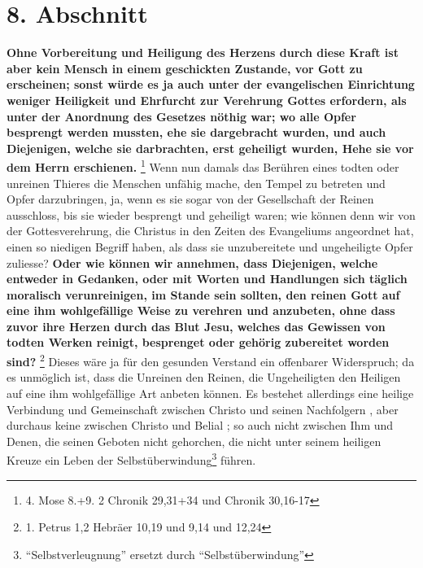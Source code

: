 \section{8. Abschnitt} \label{kap6_ab8}

\textbf{Ohne Vorbereitung und Heiligung des Herzens
durch diese Kraft ist aber kein
Mensch in einem geschickten Zustande, vor Gott zu erscheinen; sonst würde es ja
auch unter der evangelischen Einrichtung weniger Heiligkeit und Ehrfurcht zur
Verehrung Gottes erfordern, als unter der Anordnung des Gesetzes nöthig war; wo
alle Opfer besprengt werden mussten, ehe sie dargebracht wurden, und auch
Diejenigen, welche sie darbrachten, erst geheiligt wurden, Hehe sie vor dem
Herrn erschienen.}
\footnote{4. Mose 8.+9. 2 Chronik 29,31+34 und Chronik 30,16-17}
Wenn nun damals das Berühren eines todten oder unreinen Thieres die Menschen
unfähig mache, den Tempel zu betreten und Opfer darzubringen, ja, wenn es sie
sogar von der Gesellschaft der Reinen ausschloss, bis sie wieder besprengt und
geheiligt waren; wie können denn wir von der Gottesverehrung, die Christus in
den Zeiten des Evangeliums angeordnet hat, einen so niedigen Begriff haben, als
dass sie unzubereitete und ungeheiligte Opfer zuliesse? \textbf{Oder wie können
wir
annehmen, dass Diejenigen, welche entweder in Gedanken, oder mit Worten und
Handlungen sich täglich moralisch verunreinigen, im Stande sein sollten, den
reinen Gott auf eine ihm wohlgefällige Weise zu verehren und anzubeten, ohne
dass zuvor ihre Herzen durch das Blut Jesu, welches das Gewissen von todten
Werken  reinigt, besprenget oder gehörig zubereitet worden
sind?}
\footnote{1. Petrus 1,2  Hebräer 10,19 und 9,14 und 12,24}
Dieses wäre ja für den gesunden Verstand ein
offenbarer Widerspruch; da es unmöglich ist, dass die Unreinen den Reinen, die
Ungeheiligten den Heiligen   auf eine ihm
wohlgefällige Art anbeten können. Es
bestehet allerdings eine heilige Verbindung und Gemeinschaft  zwischen Christo
und seinen Nachfolgern , aber durchaus keine zwischen Christo
und Belial ; so
auch nicht zwischen Ihm und Denen, die seinen Geboten nicht gehorchen, die nicht
unter seinem heiligen Kreuze ein Leben der
Selbstüberwindung\footnote{"`Selbstverleugnung"' ersetzt durch
"`Selbstüberwindung"'} führen.

